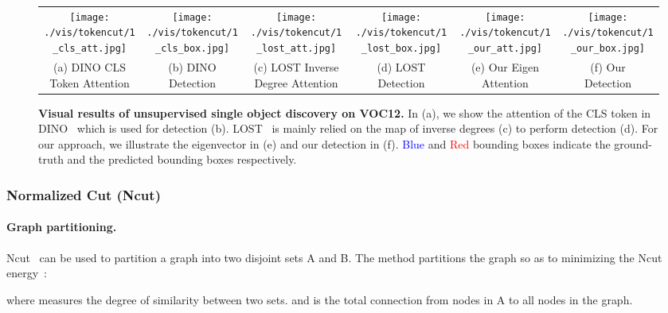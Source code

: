 \documentclass[twocolumn]{article}
\newcommand{\Degree}{\mathcal{D}}
\begin{document}
\begin{figure*}[!t]
\begin{tabular}{c@{\hskip 1.3pt}c@{\hskip 1.3pt}c@{\hskip 1.3pt}c@{\hskip 1.3pt}c@{\hskip 1.3pt}c}
		\texttt{[image: ./vis/tokencut/1\_cls\_att.jpg]} &
		\texttt{[image: ./vis/tokencut/1\_cls\_box.jpg]} &
		\texttt{[image: ./vis/tokencut/1\_lost\_att.jpg]} &
		\texttt{[image: ./vis/tokencut/1\_lost\_box.jpg]} &
		\texttt{[image: ./vis/tokencut/1\_our\_att.jpg]} &
		\texttt{[image: ./vis/tokencut/1\_our\_box.jpg]} \\
		\makecell{(a) DINO CLS \\ Token Attention}  & \makecell{(b) DINO \\ Detection} & \makecell{(c) LOST Inverse \\Degree Attention} & \makecell{(d) LOST \\ Detection} & \makecell{(e) Our Eigen \\Attention} & \makecell{(f) Our \\Detection} \\
\end{tabular}
\caption{\textbf{Visual results of unsupervised single object discovery on VOC12.} In (a), we show the attention of the CLS token in DINO~\cite{caron2021emerging} which is used for detection (b). LOST~\cite{simeoni2021localizing} is mainly relied on the map of inverse degrees (c) to perform detection (d). For our approach, we illustrate the eigenvector in (e) and our detection in (f). \textcolor{blue}{Blue} and \textcolor{red}{Red} bounding boxes indicate the ground-truth and the predicted bounding boxes respectively. }
\label{fig:visual_res}
\end{figure*}

\subsubsection{Normalized Cut (Ncut)}
\label{sec:ncut}
\paragraph{Graph partitioning.} 
Ncut~\cite{shi2000normalized} can be used to partition a graph into two disjoint sets A and B. 
The method partitions the graph so as to minimizing the Ncut energy~\cite{shi2000normalized}:



where  measures the degree of similarity between two sets.  and  is the total connection from nodes in A to all nodes in the graph. 
\end{document}
